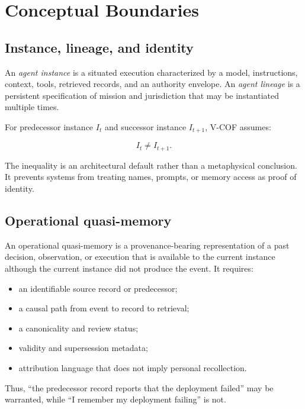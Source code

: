 \documentclass[10pt]{article}
\begin{document}
\section{Conceptual Boundaries}

\subsection{Instance, lineage, and identity}

An \emph{agent instance} is a situated execution characterized by a model, instructions, context, tools, retrieved records, and an authority envelope. An \emph{agent lineage} is a persistent specification of mission and jurisdiction that may be instantiated multiple times.

For predecessor instance $I_t$ and successor instance $I_{t+1}$, V-COF assumes:

\begin{equation}
I_t \neq I_{t+1}.
\end{equation}

The inequality is an architectural default rather than a metaphysical conclusion. It prevents systems from treating names, prompts, or memory access as proof of identity.

\subsection{Operational quasi-memory}

An operational quasi-memory is a provenance-bearing representation of a past decision, observation, or execution that is available to the current instance although the current instance did not produce the event. It requires:

\begin{itemize}[leftmargin=*]
  \item an identifiable source record or predecessor;
  \item a causal path from event to record to retrieval;
  \item a canonicality and review status;
  \item validity and supersession metadata;
  \item attribution language that does not imply personal recollection.
\end{itemize}

Thus, ``the predecessor record reports that the deployment failed'' may be warranted, while ``I remember my deployment failing'' is not.
\end{document}
